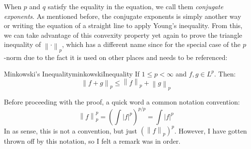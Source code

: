 \documentclass[oneside]{book}
\begin{document}
When $p$ and $q$ satisfy the equality in the equation, we call them \emph{conjugate exponents}. As mentioned before, the
conjugate exponents is simply another way or writing the equation of a straight line to apply Young's inequality. From
this, we can take advantage of this convexity property yet again to prove the triangle inequality of $\left\| \cdot
\right\|_p$, which has a different name since for the special case of the $p$-norm due to the fact it is used on other
places and needs to be referenced:

\begin{thm}{Minkowski's Inequality}{minkowskiInequality}
	If $1 \le p < \infty$ and $f,g \in L^p$. Then:
	\[
		\left\|f+g\right\|_p \le \left\|f\right\|_p+\left\|g\right\|_p
	\]
\end{thm}

Before proceeding with the proof, a quick word a common notation convention:
\[
	\left\| f\right\|_p^p = \left(\int |f|^p\right)^{p/p} = \int |f|^p
\]
In as sense, this is not a convention, but just $\left(\left\|f\right\|_p\right)^p$. However, I have gotten thrown off
by this notation, so I felt a remark was in order.
\end{document}
